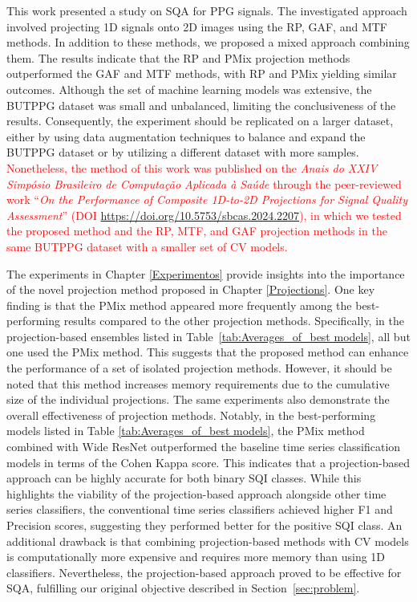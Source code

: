 This work presented a study on \gls{SQA} for \gls{PPG} signals. The investigated approach involved projecting {1D} signals onto {2D} images using the \acrshort{RP}, \acrshort{GAF}, and \acrshort{MTF} methods. In addition to these methods, we proposed a mixed approach combining them. The results indicate that the \acrshort{RP} and \gls{PMix} projection methods outperformed the \acrshort{GAF} and \acrshort{MTF} methods, with \acrshort{RP} and \gls{PMix} yielding similar outcomes. Although the set of machine learning models was extensive, the \gls{BUTPPG} dataset was small and unbalanced, limiting the conclusiveness of the results. Consequently, the experiment should be replicated on a larger dataset, either by using data augmentation techniques to balance and expand the BUTPPG dataset or by utilizing a different dataset with more samples. \textcolor{red}{Nonetheless, the method of this work was published on the \textit{Anais do XXIV Simpósio Brasileiro de Computação Aplicada à Saúde} through the peer-reviewed work ``\textit{On the Performance of Composite 1D-to-2D Projections for Signal Quality Assessment}'' (DOI \url{https://doi.org/10.5753/sbcas.2024.2207}), in which we tested the proposed method and the \gls{RP}, \gls{MTF}, and \gls{GAF} projection methods in the same \gls{BUTPPG} dataset with a smaller set of \gls{CV} models.}

The experiments in Chapter \ref{Experimentos} provide insights into the importance of the novel projection method proposed in Chapter \ref{Projections}. One key finding is that the \gls{PMix} method appeared more frequently among the best-performing results compared to the other projection methods. Specifically, in the projection-based ensembles listed in Table~\ref{tab:Averages_of_best models}, all but one used the \gls{PMix} method. This suggests that the proposed method can enhance the performance of a set of isolated projection methods. However, it should be noted that this method increases memory requirements due to the cumulative size of the individual projections. The same experiments also demonstrate the overall effectiveness of projection methods. Notably, in the best-performing models listed in Table \ref{tab:Averages_of_best models}, the \gls{PMix} method combined with Wide ResNet outperformed the baseline time series classification models in terms of the Cohen Kappa score. This indicates that a projection-based approach can be highly accurate for both binary \gls{SQI} classes. While this highlights the viability of the projection-based approach alongside other time series classifiers, the conventional time series classifiers achieved higher F1 and Precision scores, suggesting they performed better for the positive \gls{SQI} class. An additional drawback is that combining projection-based methods with \gls{CV} models is computationally more expensive and requires more memory than using 1D classifiers. Nevertheless, the projection-based approach proved to be effective for \gls{SQA}, fulfilling our original objective described in Section~\ref{sec:problem}.


